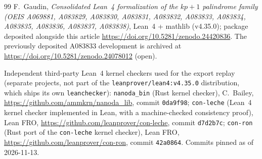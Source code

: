 \documentclass[12pt]{article}
\begin{document}
\begin{thebibliography}{99}
F.~Gaudin, \emph{Consolidated Lean~4 formalization of
the $kp+1$ palindrome family (OEIS A069881, A083829,
A083830, A083831, A083832, A083833, A083834, A083835,
A083836, A083837, A083838)}, Lean~4 + mathlib
(v4.35.0); package deposited alongside this article
\url{https://doi.org/10.5281/zenodo.24420836}.
The previously deposited A083833
development is archived at
\url{https://doi.org/10.5281/zenodo.24078012} (open).

Independent third-party Lean~4 kernel checkers used for
the export replay (separate projects, not part of the
\texttt{leanprover/lean4:v4.35.0} distribution, which
ships its own \texttt{leanchecker}): \texttt{nanoda\_bin}
(Rust kernel checker), C.~Bailey,
\url{https://github.com/ammkrn/nanoda_lib}, commit
\texttt{0da9f98}; \texttt{con-leche} (Lean~4 kernel
checker implemented in Lean, with a machine-checked
consistency proof), Lean FRO,
\url{https://github.com/leanprover/con-leche}, commit
\texttt{d7d2b7c}; \texttt{con-ron} (Rust port of the
\texttt{con-leche} kernel checker), Lean FRO,
\url{https://github.com/leanprover/con-ron}, commit
\texttt{42a0864}. Commits pinned as of 2026-11-13.

\end{thebibliography}
\end{document}

